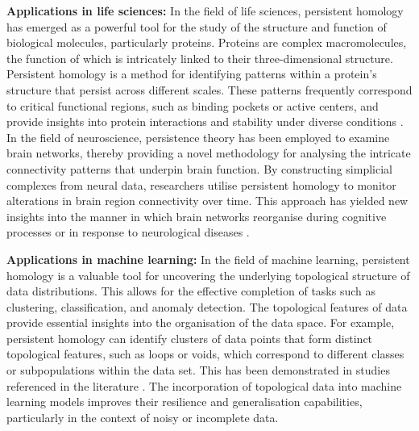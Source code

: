 \textbf{Applications in life sciences:} In the field of life sciences, persistent homology has emerged as a powerful tool for the study of the structure and function of biological molecules, particularly proteins. Proteins are complex macromolecules, the function of which is intricately linked to their three-dimensional structure. Persistent homology is a method for identifying patterns within a protein's structure that persist across different scales. These patterns frequently correspond to critical functional regions, such as binding pockets or active centers, and provide insights into protein interactions and stability under diverse conditions \cite{Kovacev-Nikolic2016}. In the field of neuroscience, persistence theory has been employed to examine brain networks, thereby providing a novel methodology for analysing the intricate connectivity patterns that underpin brain function. By constructing simplicial complexes from neural data, researchers utilise persistent homology  to monitor alterations in brain region connectivity over time. This approach has yielded new insights into the manner in which brain networks reorganise during cognitive processes or in response to neurological diseases \cite{Giusti2016, unger2023simplex}.

\textbf{Applications in machine learning:} In the field of machine learning, persistent homology is a valuable tool for uncovering the underlying topological structure of data distributions. This allows for the effective completion of tasks such as clustering, classification, and anomaly detection. The topological features of data provide essential insights into the organisation of the data space. For example, persistent homology can identify clusters of data points that form distinct topological features, such as loops or voids, which correspond to different classes or subpopulations within the data set. This has been demonstrated in studies referenced in the literature \cite{Hofer2017,melodia2018deep,melodia2020persistent,melodia2021estimate,melodia2021homological}. The incorporation of topological data into machine learning models improves their resilience and generalisation capabilities, particularly in the context of noisy or incomplete data.

